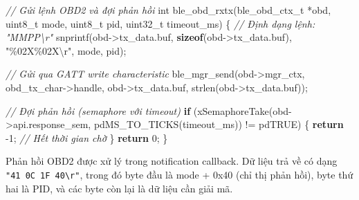 \documentclass[13pt,a4paper]{extarticle}
\newenvironment{Shaded}{}{}
\newcommand{\CommentTok}[1]{\textcolor[rgb]{0.38,0.63,0.69}{\textit{#1}}}
\newcommand{\ControlFlowTok}[1]{\textcolor[rgb]{0.00,0.44,0.13}{\textbf{#1}}}
\newcommand{\DataTypeTok}[1]{\textcolor[rgb]{0.56,0.13,0.00}{#1}}
\newcommand{\DecValTok}[1]{\textcolor[rgb]{0.25,0.63,0.44}{#1}}
\newcommand{\KeywordTok}[1]{\textcolor[rgb]{0.00,0.44,0.13}{\textbf{#1}}}
\newcommand{\NormalTok}[1]{#1}
\newcommand{\OperatorTok}[1]{\textcolor[rgb]{0.40,0.40,0.40}{#1}}
\newcommand{\SpecialCharTok}[1]{\textcolor[rgb]{0.25,0.44,0.63}{#1}}
\newcommand{\StringTok}[1]{\textcolor[rgb]{0.25,0.44,0.63}{#1}}
\renewcommand{\\}{\thesislongtableorignewline\hline}%
\begin{document}
\begin{Shaded}
\begin{Highlighting}[]
\CommentTok{// Gửi lệnh OBD2 và đợi phản hồi}
\DataTypeTok{int}\NormalTok{ ble\_obd\_rxtx}\OperatorTok{(}\NormalTok{ble\_obd\_ctx\_t }\OperatorTok{*}\NormalTok{obd}\OperatorTok{,} \DataTypeTok{uint8\_t}\NormalTok{ mode}\OperatorTok{,} \DataTypeTok{uint8\_t}\NormalTok{ pid}\OperatorTok{,}
                 \DataTypeTok{uint32\_t}\NormalTok{ timeout\_ms}\OperatorTok{)}
\OperatorTok{\{}
    \CommentTok{// Định dạng lệnh: "MMPP\textbackslash{}r"}
\NormalTok{    snprintf}\OperatorTok{(}\NormalTok{obd}\OperatorTok{{-}\textgreater{}}\NormalTok{tx\_data}\OperatorTok{.}\NormalTok{buf}\OperatorTok{,} \KeywordTok{sizeof}\OperatorTok{(}\NormalTok{obd}\OperatorTok{{-}\textgreater{}}\NormalTok{tx\_data}\OperatorTok{.}\NormalTok{buf}\OperatorTok{),}
             \StringTok{"}\SpecialCharTok{\%02X\%02X\textbackslash{}r}\StringTok{"}\OperatorTok{,}\NormalTok{ mode}\OperatorTok{,}\NormalTok{ pid}\OperatorTok{);}

    \CommentTok{// Gửi qua GATT write characteristic}
\NormalTok{    ble\_mgr\_send}\OperatorTok{(}\NormalTok{obd}\OperatorTok{{-}\textgreater{}}\NormalTok{mgr\_ctx}\OperatorTok{,}\NormalTok{ obd\_tx\_char}\OperatorTok{{-}\textgreater{}}\NormalTok{handle}\OperatorTok{,}
\NormalTok{                 obd}\OperatorTok{{-}\textgreater{}}\NormalTok{tx\_data}\OperatorTok{.}\NormalTok{buf}\OperatorTok{,}\NormalTok{ strlen}\OperatorTok{(}\NormalTok{obd}\OperatorTok{{-}\textgreater{}}\NormalTok{tx\_data}\OperatorTok{.}\NormalTok{buf}\OperatorTok{));}

    \CommentTok{// Đợi phản hồi (semaphore với timeout)}
    \ControlFlowTok{if} \OperatorTok{(}\NormalTok{xSemaphoreTake}\OperatorTok{(}\NormalTok{obd}\OperatorTok{{-}\textgreater{}}\NormalTok{api}\OperatorTok{.}\NormalTok{response\_sem}\OperatorTok{,}
\NormalTok{                       pdMS\_TO\_TICKS}\OperatorTok{(}\NormalTok{timeout\_ms}\OperatorTok{))} \OperatorTok{!=}\NormalTok{ pdTRUE}\OperatorTok{)} \OperatorTok{\{}
        \ControlFlowTok{return} \OperatorTok{{-}}\DecValTok{1}\OperatorTok{;}  \CommentTok{// Hết thời gian chờ}
    \OperatorTok{\}}
    \ControlFlowTok{return} \DecValTok{0}\OperatorTok{;}
\OperatorTok{\}}
\end{Highlighting}
\end{Shaded}

Phản hồi OBD2 được xử lý trong notification callback. Dữ liệu trả về có
dạng \texttt{"41\ 0C\ 1F\ 40\textbackslash{}r"}, trong đó byte đầu là
mode + 0x40 (chỉ thị phản hồi), byte thứ hai là PID, và các byte còn lại
là dữ liệu cần giải mã.
\end{document}
